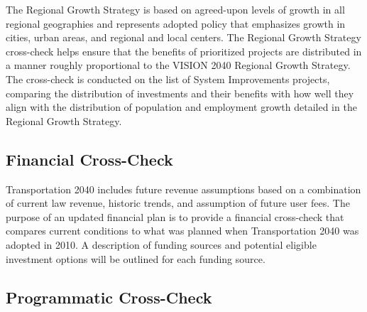 \documentclass[10pt, letterpaper, final, twoside, onecolumn]{memoir}%
\begin{document}
The Regional Growth Strategy is based on agreed-upon levels of growth in all regional geographies and represents adopted policy that emphasizes growth in cities, urban areas, and regional and local centers. The Regional Growth Strategy cross-check helps ensure that the benefits of prioritized projects are distributed in a manner roughly proportional to the VISION 2040 Regional Growth Strategy. The cross-check is conducted on the list of System Improvements projects, comparing the distribution of investments and their benefits with how well they align with the distribution of population and employment growth detailed in the Regional Growth Strategy.

\subsection{Financial Cross-Check}

Transportation 2040 includes future revenue assumptions based on a combination of current law revenue, historic trends, and assumption of future user fees. The purpose of an updated financial plan is to provide a financial cross-check that compares current conditions to what was planned when Transportation 2040 was adopted in 2010. A description of funding sources and potential eligible investment options will be outlined for each funding source.

\subsection{Programmatic Cross-Check}
\end{document}
